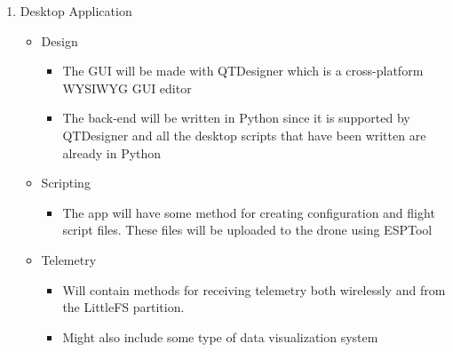 \documentclass[12pt, titlepage]{article}
\begin{document}
\begin{enumerate}
\begin{itemize}
		\item I$^2$C Sensor Communication
		\begin{itemize}
			\item Successfully implemented sensor readdressing code. This means that each sensor's data can be individually recorded. Communication with the IMU and the time of flight sensors has been established simultaneously.
		\end{itemize}
	\end{itemize}
	\item Desktop Application
	\begin{itemize}
		\item Design
		\begin{itemize}
			\item The GUI will be made with QTDesigner which is a cross-platform WYSIWYG GUI editor
			\item The back-end will be written in Python since it is supported by QTDesigner and all the desktop scripts that have been written are already in Python 
		\end{itemize}
		\item Scripting
		\begin{itemize}
			\item The app will have some method for creating configuration and flight script files. These files will be uploaded to the drone using ESPTool
		\end{itemize}
		\item Telemetry
		\begin{itemize}
			\item Will contain methods for receiving telemetry both wirelessly and from the LittleFS partition. 
			\item Might also include some type of data visualization system
		\end{itemize}
	\end{itemize}
\end{enumerate}
\end{document}
